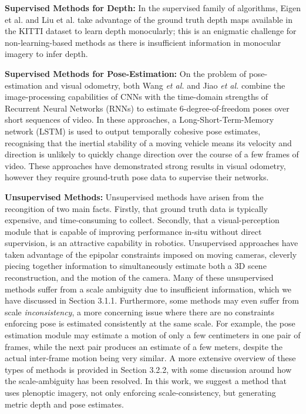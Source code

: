 \textbf{Supervised Methods for Depth: } In the supervised family of algorithms, Eigen et al. \cite{eigen2014supervised} and Liu et al. \cite{liu2015supervised} take advantage of the ground truth depth maps available in the KITTI dataset to learn depth monocularly; this is an enigmatic challenge for non-learning-based methods as there is insufficient information in monocular imagery to infer depth.

\textbf{Supervised Methods for Pose-Estimation: } On the problem of pose-estimation and visual odometry, both Wang \textit{et al.} \cite{wang2017deepvo} and Jiao \textit{et al.} \cite{jiao2018magicvo} combine the image-processing capabilities of CNNs with the time-domain strengths of Recurrent Neural Networks (RNNs) to estimate 6-degree-of-freedom poses over short sequences of video. In these approaches, a Long-Short-Term-Memory network (LSTM) is used to output temporally cohesive pose estimates, recognising that the inertial stability of a moving vehicle means its velocity and direction is unlikely to quickly change direction over the course of a few frames of video. These approaches have demonstrated strong results in visual odometry, however they require ground-truth pose data to supervise their networks.

\textbf{Unsupervised Methods: } Unsupervised methods have arisen from the recongition of two main facts. Firstly, that ground truth data is typically expensive, and time-consuming to collect. Secondly, that a visual-perception module that is capable of improving performance in-situ without direct supervision, is an attractive capability in robotics. Unsupervised approaches \cite{garg2016unsupervised,zhou2017unsupervised} have taken advantage of the epipolar constraints imposed on moving cameras, cleverly piecing together information to simultaneously estimate both a 3D scene reconstruction, and the motion of the camera. Many of these unsupervised methods suffer from a scale ambiguity due to insufficient information, which we have discussed in Section 3.1.1. Furthermore, some methods may even suffer from scale \textit{inconsistency}, a more concerning issue where there are no constraints enforcing pose is estimated consistently at the same scale. For example, the pose estimation module may estimate a motion of only a few centimeters in one pair of frames, while the next pair produces an estimate of a few meters, despite the actual inter-frame motion being very similar. A more extensive overview of these types of methods is provided in Section 3.2.2, with some discussion around how the scale-ambiguity has been resolved. In this work, we suggest a method that uses plenoptic imagery, not only enforcing scale-consistency, but generating metric depth and pose estimates.


